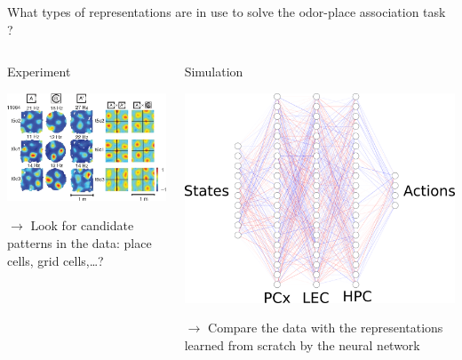 \documentclass[bigger]{beamer}
\begin{document}
\begin{frame}[label={sec:org4b07cd7}]{What types of representations are in use to solve the odor-place association task ?}
\begin{columns}
\begin{column}[t]{0.5\columnwidth}
\begin{center}
Experiment
\end{center}
\begin{center}
\includegraphics[height=0.25\textheight]{img/place-cells-grid-cells.jpg.png}
\end{center}
\(\to\) Look for candidate patterns in the data: place cells, grid cells,\dots{}?
\end{column}
\begin{column}[t]{0.5\columnwidth}
\begin{center}
Simulation
\end{center}
\begin{center}
\includegraphics[height=0.25\textheight]{img/nn.svg.png}
\end{center}
\(\to\) Compare the data with the representations learned from scratch by the neural network


\end{column}
\end{columns}
\end{frame}
\end{document}
